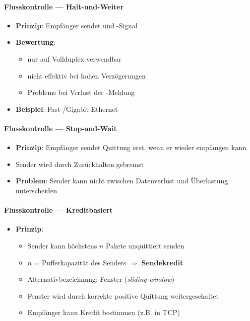 \paragraph{Flusskontrolle --- Halt-und-Weiter}
\begin{itemize}
  \item \textbf{Prinzip}: Empfänger sendet  und -Signal
  \item \textbf{Bewertung}:
  \begin{itemize}
    \item nur auf Vollduplex verwendbar
    \item nicht effektiv bei hohen Verzögerungen
    \item Probleme bei Verlust der -Meldung
  \end{itemize}
  \item \textbf{Beispiel}: Fast-/Gigabit-Ethernet
\end{itemize}

\paragraph{Flusskontrolle --- Stop-and-Wait}
\begin{itemize}
  \item \textbf{Prinzip}: Empfänger sendet Quittung erst, wenn er wieder empfangen kann
   \item Sender wird durch Zurückhalten gebremst
  \item \textbf{Problem}: Sender kann nicht zwischen Datenverlust und Überlastung unterscheiden
\end{itemize}

\paragraph{Flusskontrolle --- Kreditbasiert}
\begin{itemize}
  \item \textbf{Prinzip}:
  \begin{itemize}
    \item Sender kann höchstens \( n \) Pakete unquittiert senden
    \item \( n \) = Pufferkapazität des Senders \( \Rightarrow \) \textbf{Sendekredit}
    \item Alternativbezeichnung: Fenster (\emph{sliding window})
    \item Fenster wird durch korrekte positive Quittung weitergeschaltet
    \item Empfänger kann Kredit bestimmen (z.B. in TCP)
  \end{itemize}
\end{itemize}

